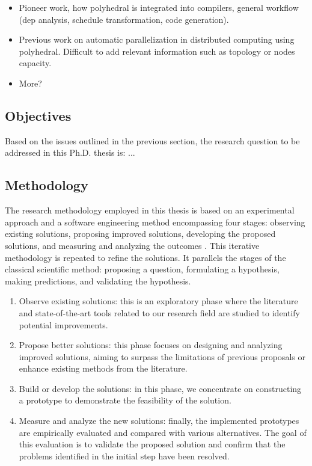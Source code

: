 \documentclass[a4paper, 11pt]{article}
\begin{document}
\begin{itemize}
    \item Pioneer work, how polyhedral is integrated into compilers, general workflow (dep analysis, schedule transformation, code generation).
    \item Previous work on automatic parallelization in distributed computing using polyhedral. Difficult to add relevant information such as topology or nodes capacity.
    \item More?
\end{itemize}

\subsection{Objectives}
Based on the issues outlined in the previous section, the research question to be addressed in this Ph.D. thesis is: ...

\subsection{Methodology}
The research methodology employed in this thesis is based on an experimental approach and a software engineering method encompassing four stages: observing existing solutions, proposing improved solutions, developing the proposed solutions, and measuring and analyzing the outcomes \cite{adrion1993research}. This iterative methodology is repeated to refine the solutions. It parallels the stages of the classical scientific method: proposing a question, formulating a hypothesis, making predictions, and validating the hypothesis.

\begin{enumerate}
    \item Observe existing solutions: this is an exploratory phase where the literature and state-of-the-art tools related to our research field are studied to identify potential improvements.
    \item Propose better solutions: this phase focuses on designing and analyzing improved solutions, aiming to surpass the limitations of previous proposals or enhance existing methods from the literature.
    \item Build or develop the solutions: in this phase, we concentrate on constructing a prototype to demonstrate the feasibility of the solution.
    \item Measure and analyze the new solutions: finally, the implemented prototypes are empirically evaluated and compared with various alternatives. The goal of this evaluation is to validate the proposed solution and confirm that the problems identified in the initial step have been resolved.
\end{enumerate}
\end{document}

